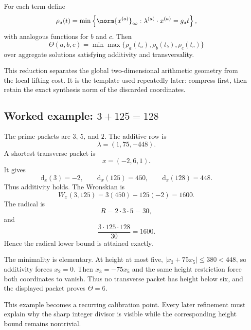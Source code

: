 For each term define
\[
 \rho_a(t)
 =
 \min\left\{
 \norm{x^{(a)}}_\infty:
 \lambda^{(a)}\cdot x^{(a)}=g_at
 \right\},
\]
with analogous functions for $b$ and $c$. Then
\[
 \Theta(a,b,c)
 =
 \min
 \max\{\rho_a(t_a),\rho_b(t_b),\rho_c(t_c)\}
\]
over aggregate solutions satisfying additivity and transversality.

This reduction separates the global two-dimensional arithmetic geometry from the local lifting cost. It is the template used repeatedly later: compress first, then retain the exact synthesis norm of the discarded coordinates.

\subsection{Worked example: \texorpdfstring{$3+125=128$}{3+125=128}}
The prime packets are $3$, $5$, and $2$. The additive row is
\[
 \lambda=(1,75,-448).
\]
A shortest transverse packet is
\[
 x=(-2,6,1).
\]
It gives
\[
 \mathrm d_x(3)=-2,
 \qquad
 \mathrm d_x(125)=450,
 \qquad
 \mathrm d_x(128)=448.
\]
Thus additivity holds. The Wronskian is
\[
 W_x(3,125)
 =3(450)-125(-2)
 =1600.
\]
The radical is
\[
 R=2\cdot3\cdot5=30,
\]
and
\[
 \frac{3\cdot125\cdot128}{30}=1600.
\]
Hence the radical lower bound is attained exactly.

The minimality is elementary. At height at most five, $|x_3+75x_5|\le380<448$, so additivity forces $x_2=0$. Then $x_3=-75x_5$ and the same height restriction force both coordinates to vanish. Thus no transverse packet has height below six, and the displayed packet proves $\Theta=6$.

This example becomes a recurring calibration point. Every later refinement must explain why the sharp integer divisor is visible while the corresponding height bound remains nontrivial.

